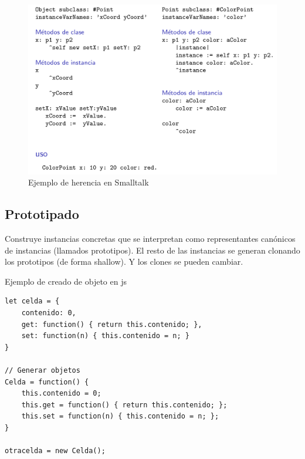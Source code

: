 \documentclass{report}
\theoremstyle{definition} %
\begin{document}
\begin{figure}[H]
    \centering
    \includegraphics[scale=0.25]{img/poo/st-inheritance.png}
    \caption{Ejemplo de herencia en Smalltalk}
\end{figure}

\subsection{Prototipado}

Construye instancias concretas que se interpretan como representantes canónicos
de instancias (llamados prototipos). El resto de las instancias se generan
clonando los prototipos (de forma shallow). Y los clones se pueden cambiar.

Ejemplo de creado de objeto en js

\begin{verbatim}
let celda = {
    contenido: 0,
    get: function() { return this.contenido; },
    set: function(n) { this.contenido = n; }
}

// Generar objetos
Celda = function() {
    this.contenido = 0;
    this.get = function() { return this.contenido; };
    this.set = function(n) { this.contenido = n; };
}

otracelda = new Celda();
\end{verbatim}

\newcommand{\obj}[1]{[\ #1\ ]} %
\newcommand{\emptyobj}{[]} %
\newcommand{\attr}[2]{#1 = #2} %
\newcommand{\met}[2]{\varsigma (#1) #2} %
\newcommand{\sel}[2]{#1.#2} %
\newcommand{\update}[3]{\sel{#1}{#2} \Leftarrow #3} %
\newcommand{\asgn}[3]{\sel{#1}{#2} := #3}
\end{document}
